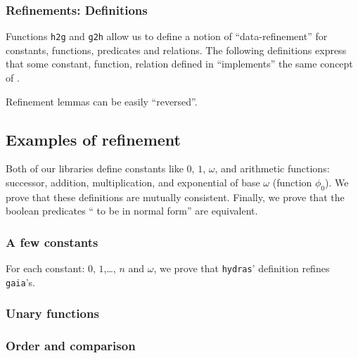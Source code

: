 



\subsubsection{Refinements: Definitions}


Functions \texttt{h2g} and \texttt{g2h} allow us to define
a notion of ``data-refinement''  for constants, functions, predicates and relations. The following definitions express that some
constant, function, relation defined in \HydrasLib ``implements'' the same concept of \gaia.









Refinement lemmas can be easily ``reversed''.


\subsection{Examples of refinement}
Both of our libraries define constants like $0$, $1$, $\omega$, and arithmetic functions: successor, addition, multiplication, and exponential of base $\omega$ (function $\phi_0$). We prove that these definitions are mutually consistent. Finally, we prove that the boolean predicates `` to be in normal form'' are equivalent.

\subsubsection{A few constants}
For each constant: $0$, $1$,\dots, $n$ and $\omega$, we prove
that \texttt{hydras}' definition refines \texttt{gaia}'s.

\subsubsection{Unary functions}


\subsubsection{Order and comparison}
\label{sect:lt-compat-gaia}

